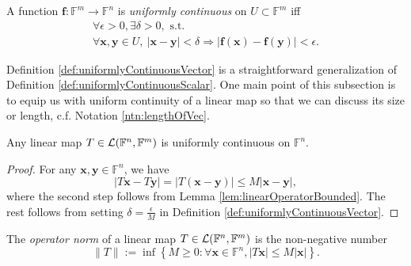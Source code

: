 \begin{defn}
  \label{def:uniformlyContinuousVector}
  A function $\mathbf{f}: \mathbb{F}^m\rightarrow \mathbb{F}^n$
  is \emph{uniformly continuous} on $U\subset \mathbb{F}^m$
  iff
   \begin{equation}
     \label{eq:uniformlyContinuousVector}
     \begin{array}{l}
     \forall \epsilon>0, \exists \delta>0,\text{ s.t. }
     \\
     \forall \mathbf{x},\mathbf{y}\in U,\ 
       |\mathbf{x}-\mathbf{y}|<\delta \Rightarrow
       |\mathbf{f}(\mathbf{x})-\mathbf{f}(\mathbf{y})|<\epsilon.
     \end{array}
   \end{equation}
\end{defn}

\begin{rem}
  Definition \ref{def:uniformlyContinuousVector}
  is a straightforward generalization
  of Definition \ref{def:uniformlyContinuousScalar}.
  One main point of this subsection is to
  equip us with uniform continuity of a linear map
  so that we can discuss its size or length, c.f. Notation \ref{ntn:lengthOfVec}.
\end{rem}

\begin{coro}
  \label{coro:linearMapIsUniformlyCont}
  Any linear map
  $T\in {\cal L}(\mathbb{F}^n,\mathbb{F}^m)$
  is uniformly continuous on $\mathbb{F}^n$.
\end{coro}
\begin{proof}
  For any $\mathbf{x},\mathbf{y}\in \mathbb{F}^n$,
  we have
  \begin{displaymath}
    |T\mathbf{x} - T\mathbf{y}|
    = |T(\mathbf{x} - \mathbf{y})|
    \le M |\mathbf{x} - \mathbf{y}|,
  \end{displaymath}
  where the second step follows
  from Lemma \ref{lem:linearOperatorBounded}. 
  The rest follows from setting $\delta = \frac{\epsilon}{M}$
  in Definition \ref{def:uniformlyContinuousVector}.
\end{proof}

\begin{defn}
  \label{def:operatorNorm}
  The \emph{operator norm} of a linear map
  \mbox{$T\in {\cal L}(\mathbb{F}^n,\mathbb{F}^m)$}
  is the non-negative number %
  \begin{equation}
    \label{eq:operatorNorm}
    \|T\| := \inf%
    \left\{
      M\ge 0 : \forall \mathbf{x}\in \mathbb{F}^n,
      |T\mathbf{x}| \le M |\mathbf{x}|
    \right\}.
  \end{equation}
\end{defn}

